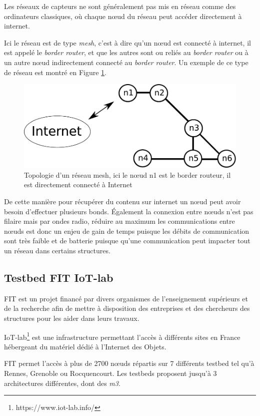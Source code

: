 Les réseaux de capteurs ne sont généralement pas mis en réseau comme des ordinateurs classiques, où chaque nœud du réseau peut accéder directement à internet.

Ici le réseau est de type \emph{mesh}, c'est à dire qu'un nœud est connecté à internet, il est appelé le \emph{border router}, et que les autres sont ou reliés au \emph{border router} ou à un autre nœud indirectement connecté au \emph{border router}. Un exemple de ce type de réseau est montré en Figure \ref{mesh-network}.

\begin{figure}[ht!]
\centering
\includegraphics[scale=0.6]{images/mesh.pdf}
\caption{Topologie d'un réseau mesh, ici le nœud n1 est le border routeur, il est directement connecté à Internet}
\label{mesh-network}
\end{figure}

De cette manière pour récupérer du contenu sur internet un nœud peut avoir besoin d'effectuer plusieurs bonds. Également la connexion entre nœuds n'est pas filaire mais par ondes radio, réduire au maximum les communications entre nœuds est donc un enjeu de gain de temps puisque les débits de communication sont très faible et de batterie puisque qu'une communication peut impacter tout un réseau dans certains structures.

\subsection{Testbed FIT IoT-lab}

FIT est un projet financé par divers organismes de l'enseignement supérieurs et de la recherche afin de mettre à disposition des entreprises et des chercheurs des structures pour les aider dans leurs travaux.

IoT-lab\footnote{https://www.iot-lab.info/} est une infrastructure permettant l'accès à différents sites en France hébergeant du matériel dédié à l'Internet des Objets.

FIT permet l'accès à plus de 2700 nœuds répartis sur 7 différents testbed tel qu'à Rennes, Grenoble ou Rocquencourt. Les testbeds proposent jusqu'à 3 architectures différentes, dont des \emph{m3}.

